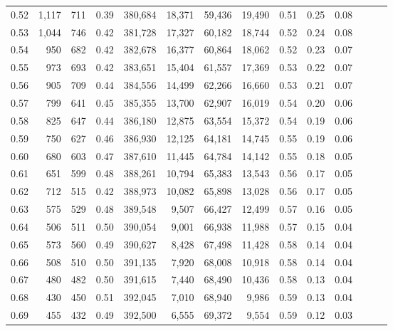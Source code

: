 \begin{tabular}{rrrrrrrrrrrrrr}
0.52 &   1,117 &    711 &  0.39 &  380,684 &   18,371 &  59,436 &  19,490 &  0.51 &  0.25 &      0.08 \\
0.53 &   1,044 &    746 &  0.42 &  381,728 &   17,327 &  60,182 &  18,744 &  0.52 &  0.24 &      0.08 \\
0.54 &     950 &    682 &  0.42 &  382,678 &   16,377 &  60,864 &  18,062 &  0.52 &  0.23 &      0.07 \\
0.55 &     973 &    693 &  0.42 &  383,651 &   15,404 &  61,557 &  17,369 &  0.53 &  0.22 &      0.07 \\
0.56 &     905 &    709 &  0.44 &  384,556 &   14,499 &  62,266 &  16,660 &  0.53 &  0.21 &      0.07 \\
0.57 &     799 &    641 &  0.45 &  385,355 &   13,700 &  62,907 &  16,019 &  0.54 &  0.20 &      0.06 \\
0.58 &     825 &    647 &  0.44 &  386,180 &   12,875 &  63,554 &  15,372 &  0.54 &  0.19 &      0.06 \\
0.59 &     750 &    627 &  0.46 &  386,930 &   12,125 &  64,181 &  14,745 &  0.55 &  0.19 &      0.06 \\
0.60 &     680 &    603 &  0.47 &  387,610 &   11,445 &  64,784 &  14,142 &  0.55 &  0.18 &      0.05 \\
0.61 &     651 &    599 &  0.48 &  388,261 &   10,794 &  65,383 &  13,543 &  0.56 &  0.17 &      0.05 \\
0.62 &     712 &    515 &  0.42 &  388,973 &   10,082 &  65,898 &  13,028 &  0.56 &  0.17 &      0.05 \\
0.63 &     575 &    529 &  0.48 &  389,548 &    9,507 &  66,427 &  12,499 &  0.57 &  0.16 &      0.05 \\
0.64 &     506 &    511 &  0.50 &  390,054 &    9,001 &  66,938 &  11,988 &  0.57 &  0.15 &      0.04 \\
0.65 &     573 &    560 &  0.49 &  390,627 &    8,428 &  67,498 &  11,428 &  0.58 &  0.14 &      0.04 \\
0.66 &     508 &    510 &  0.50 &  391,135 &    7,920 &  68,008 &  10,918 &  0.58 &  0.14 &      0.04 \\
0.67 &     480 &    482 &  0.50 &  391,615 &    7,440 &  68,490 &  10,436 &  0.58 &  0.13 &      0.04 \\
0.68 &     430 &    450 &  0.51 &  392,045 &    7,010 &  68,940 &   9,986 &  0.59 &  0.13 &      0.04 \\
0.69 &     455 &    432 &  0.49 &  392,500 &    6,555 &  69,372 &   9,554 &  0.59 &  0.12 &      0.03 \\

\end{tabular}

